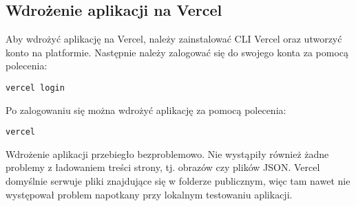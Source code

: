 \documentclass[a4paper,12pt]{article}
\begin{document}
\subsection{Wdrożenie aplikacji na Vercel}
Aby wdrożyć aplikację na Vercel, należy zainstalować CLI Vercel oraz utworzyć konto na platformie. Następnie należy zalogować się do swojego konta za pomocą polecenia:
\begin{lstlisting}
vercel login
\end{lstlisting}
Po zalogowaniu się można wdrożyć aplikację za pomocą polecenia:
\begin{lstlisting}
vercel
\end{lstlisting}
Wdrożenie aplikacji przebiegło bezproblemowo. Nie wystąpiły również żadne problemy z ładowaniem treści strony, tj. obrazów czy plików JSON. Vercel domyślnie serwuje pliki znajdujące się w folderze publicznym, więc tam nawet nie występował problem napotkany przy lokalnym testowaniu aplikacji.
\end{document}
